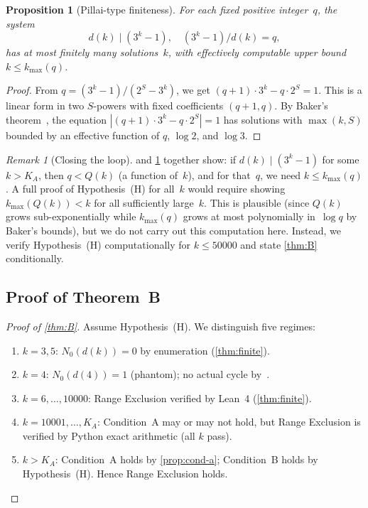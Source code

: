 \documentclass[11pt, a4paper]{amsart}
\theoremstyle{plain}
\newtheorem{proposition}[theorem]{Proposition}
\theoremstyle{definition}
\theoremstyle{remark}
\newtheorem{remark}[theorem]{Remark}
\begin{document}
\begin{proposition}[Pillai-type finiteness]\label{prop:pillai}
  For each fixed positive integer~$q$, the system
  \begin{equation}\label{eq:pillai}
    d(k) \mid (3^k - 1), \quad (3^k - 1)/d(k) = q,
  \end{equation}
  has at most finitely many solutions~$k$, with effectively
  computable upper bound $k \leq k_{\max}(q)$.
\end{proposition}

\begin{proof}
  From $q = (3^k - 1)/(2^S - 3^k)$, we get
  $(q+1) \cdot 3^k - q \cdot 2^S = 1$.  This is a linear
  form in two $S$-powers with fixed coefficients $(q+1, q)$.
  By Baker's theorem~\cite{BakerWustholz1993}, the equation
  $|(q+1) \cdot 3^k - q \cdot 2^S| = 1$ has solutions with
  $\max(k, S)$ bounded by an effective function of
  $q$, $\log 2$, and $\log 3$.
\end{proof}

\begin{remark}[Closing the loop]\label{rem:closing}
   and \cref{prop:pillai} together show:
  if $d(k) \mid (3^k-1)$ for some $k > K_A$, then $q < Q(k)$
  (a function of~$k$), and for that~$q$, we need
  $k \leq k_{\max}(q)$.  A full proof of Hypothesis~(H) for
  all~$k$ would require showing $k_{\max}(Q(k)) < k$ for all
  sufficiently large~$k$.  This is plausible (since $Q(k)$
  grows sub-exponentially while $k_{\max}(q)$ grows at most
  polynomially in~$\log q$ by Baker's bounds), but we do not
  carry out this computation here.  Instead, we verify
  Hypothesis~(H) computationally for $k \leq 50000$ and
  state \cref{thm:B} conditionally.
\end{remark}

\subsection{Proof of Theorem~B}\label{ssec:proof-B}

\begin{proof}[Proof of \cref{thm:B}]
  Assume Hypothesis~(H).  We distinguish five regimes:
  \begin{enumerate}[label=\textbf{(\roman*)}]
    \item $k = 3, 5$: $N_0(d(k)) = 0$ by enumeration
          (\cref{thm:finite}).
    \item $k = 4$: $N_0(d(4)) = 1$ (phantom); no actual cycle
          by~\cite{SimonsDeWeger2005}.
    \item $k = 6, \ldots, 10000$: Range Exclusion verified by
          Lean~4 (\cref{thm:finite}).
    \item $k = 10001, \ldots, K_A$: Condition~A may or may not hold,
          but Range Exclusion is verified by Python exact arithmetic
          (all $k$ pass).
    \item $k > K_A$: Condition~A holds by \cref{prop:cond-a};
          Condition~B holds by Hypothesis~(H).
          Hence Range Exclusion holds. \qedhere
  \end{enumerate}
\end{proof}
\end{document}
